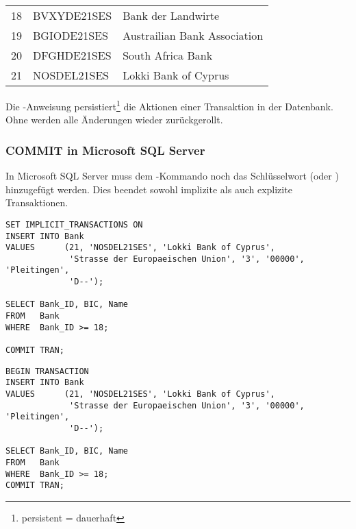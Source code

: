 \begin{center}
    \begin{small}
        \tablehead{}
        \tabletail {
        }
        \begin{msoraclesql}
            \begin{supertabular}{rll}
                18 & BVXYDE21SES & Bank der Landwirte \\
                19 & BGIODE21SES & Austrailian Bank Association \\
                20 & DFGHDE21SES & South Africa Bank \\
                21 & NOSDEL21SES & Lokki Bank of Cyprus  \\
            \end{supertabular}
        \end{msoraclesql}
    \end{small}
\end{center}
\begin{merke}
    Die \COMMIT-Anweisung persistiert\footnote{persistent = dauerhaft}
    die Aktionen einer Transaktion in der Datenbank. Ohne \COMMIT{} werden alle
    Änderungen wieder zurückgerollt.
\end{merke}
\subsubsection{COMMIT in Microsoft SQL Server}
In Microsoft SQL Server muss dem \COMMIT-Kommando noch das
Schlüsselwort  (oder
) hinzugefügt werden. Dies beendet sowohl
implizite als auch explizite Transaktionen.
\begin{lstlisting}[language=ms_sql,caption={Eine implizite Transaktion
        committen},label=sql07_27a]
SET IMPLICIT_TRANSACTIONS ON
INSERT INTO Bank
VALUES      (21, 'NOSDEL21SES', 'Lokki Bank of Cyprus',
             'Strasse der Europaeischen Union', '3', '00000', 'Pleitingen',
             'D--');

SELECT Bank_ID, BIC, Name
FROM   Bank
WHERE  Bank_ID >= 18;

COMMIT TRAN;
        \end{lstlisting}
\clearpage
\begin{lstlisting}[language=ms_sql,caption={Eine explizite Transaktion
        committen},label=sql07_27b]
BEGIN TRANSACTION
INSERT INTO Bank
VALUES      (21, 'NOSDEL21SES', 'Lokki Bank of Cyprus',
             'Strasse der Europaeischen Union', '3', '00000', 'Pleitingen',
             'D--');

SELECT Bank_ID, BIC, Name
FROM   Bank
WHERE  Bank_ID >= 18;
COMMIT TRAN;
        \end{lstlisting}

